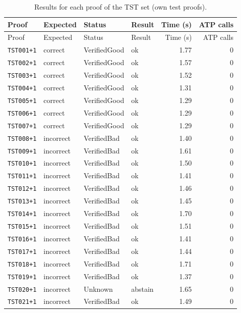 \begin{longtable}{@{}l l l l r r@{}}
\caption{Results for each proof of the TST set (own test proofs).}\label{tab:app-tst}\\
\toprule
Proof & Expected & Status & Result & Time (s) & ATP calls \\
\midrule
\endfirsthead
\toprule
Proof & Expected & Status & Result & Time (s) & ATP calls \\
\midrule
\endhead
\bottomrule
\endlastfoot
\texttt{TST001{+}1} & correct & VerifiedGood & ok & 1.77 & 0 \\
\texttt{TST002{+}1} & correct & VerifiedGood & ok & 1.57 & 0 \\
\texttt{TST003{+}1} & correct & VerifiedGood & ok & 1.52 & 0 \\
\texttt{TST004{+}1} & correct & VerifiedGood & ok & 1.31 & 0 \\
\texttt{TST005{+}1} & correct & VerifiedGood & ok & 1.29 & 0 \\
\texttt{TST006{+}1} & correct & VerifiedGood & ok & 1.29 & 0 \\
\texttt{TST007{+}1} & correct & VerifiedGood & ok & 1.29 & 0 \\
\texttt{TST008{+}1} & incorrect & VerifiedBad & ok & 1.40 & 0 \\
\texttt{TST009{+}1} & incorrect & VerifiedBad & ok & 1.61 & 0 \\
\texttt{TST010{+}1} & incorrect & VerifiedBad & ok & 1.50 & 0 \\
\texttt{TST011{+}1} & incorrect & VerifiedBad & ok & 1.41 & 0 \\
\texttt{TST012{+}1} & incorrect & VerifiedBad & ok & 1.46 & 0 \\
\texttt{TST013{+}1} & incorrect & VerifiedBad & ok & 1.45 & 0 \\
\texttt{TST014{+}1} & incorrect & VerifiedBad & ok & 1.70 & 0 \\
\texttt{TST015{+}1} & incorrect & VerifiedBad & ok & 1.51 & 0 \\
\texttt{TST016{+}1} & incorrect & VerifiedBad & ok & 1.41 & 0 \\
\texttt{TST017{+}1} & incorrect & VerifiedBad & ok & 1.44 & 0 \\
\texttt{TST018{+}1} & incorrect & VerifiedBad & ok & 1.71 & 0 \\
\texttt{TST019{+}1} & incorrect & VerifiedBad & ok & 1.37 & 0 \\
\texttt{TST020{+}1} & incorrect & Unknown & abstain & 1.65 & 0 \\
\texttt{TST021{+}1} & incorrect & VerifiedBad & ok & 1.49 & 0 \\

\end{longtable}
